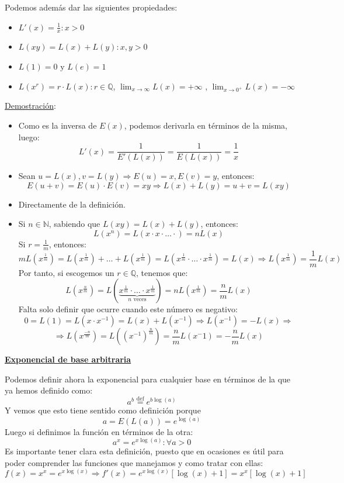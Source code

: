 \documentclass[10pt,a4paper,openright]{book}
\begin{document}
Podemos además dar las siguientes propiedades:
\begin{itemize}
\item $L'(x) = \frac{1}{x} : x > 0$
\item $L(xy) = L(x) +L(y) : x,y > 0$
\item $L(1) = 0 \mbox{ y } L(e) = 1$
\item $L(x^r) = r\cdot L(x) : r \in \mathbb{Q}$, $\lim_{x \to \infty} L(x) = + \infty$ , $\lim_{x \to 0^+} L(x) = - \infty$
\end{itemize}
\underline{Demostración}:
\begin{itemize}
\item Como es la inversa de $E(x)$, podemos derivarla en términos de la misma, luego:
$$L'(x) = \frac{1}{E'(L(x))} = \frac{1}{E(L(x))} = \frac{1}{x}$$
\item Sean $u = L(x), v= L(y)\Rightarrow E(u) = x, E(v) = y $, entonces:
$$E(u+v) = E(u) \cdot E(v) = xy \Rightarrow L(x) + L(y) = u+v = L(xy)$$
\item Directamente de la definición.
\item Si $n \in \mathbb{N}$, sabiendo que $L(xy) = L(x) +L(y)$, entonces:
$$L(x^n) = L(x \cdot x \cdot \ldots \cdot ) = n L(x)$$
Si $r = \frac{1}{m}$, entonces:
$$mL(x^\frac{1}{m}) = L(x^\frac{1}{m}) + \ldots + L(x^\frac{1}{m}) =L(x^\frac{1}{m} \cdot \ldots \cdot x^\frac{1}{m}) = L(x) \Rightarrow L(x^\frac{1}{m}) = \frac{1}{m} L(x)$$
Por tanto, si escogemos un $r\in \mathbb Q$, tenemos que:
$$L(x^\frac{n}{m}) = L(\underbrace{x^\frac{1}{m} \cdot \ldots \cdot x^\frac{1}{m}}_{n \mbox{ veces}}) = n L(x^\frac{1}{m}) = \frac{n}{m} L(x)$$
Falta solo definir que ocurre cuando este número es negativo:
$$0 = L(1) = L(x \cdot x^{-1}) = L(x) + L(x^{-1}) \Rightarrow L(x^{-1}) = - L(x) \Rightarrow $$
$$\Rightarrow L(x^\frac{-n}{m}) = L((x^{-1})^\frac{n}{m}) = \frac{n}{m} L(x^-1) = -\frac{n}{m} L(x)$$
\end{itemize}

\underline{\textbf{Exponencial de base arbitraria}}

Podemos definir ahora la exponencial para cualquier base en términos de la que ya hemos definido como:
$$a^b \overset{\mbox{def}}{=} e^{b \log(a)}$$
Y vemos que esto tiene sentido como definición porque
$$a = E(L(a)) = e^{\log(a)}$$
Luego si definimos la función en términos de la otra:
$$a^x = e^{x \log(a)}: \forall a > 0$$
Es importante tener clara esta definición, puesto que en ocasiones es útil para poder comprender las funciones que manejamos y como tratar con ellas:
$$f(x) = x^x = e^{x \log(x)} \Rightarrow f'(x) = e^{x \log(x)} [\log(x) + 1] = x^x  [\log(x) + 1]$$
\end{document}

